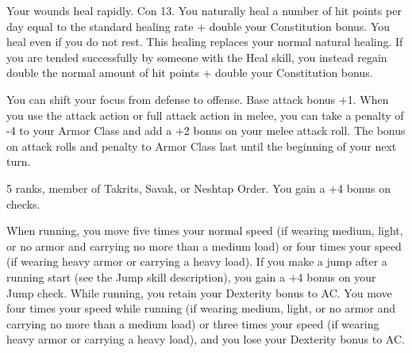 {Your wounds heal rapidly.}
{Con 13.}
{You naturally heal a number of hit points per day equal to the standard healing rate + double your Constitution bonus. You heal even if you do not rest. This healing replaces your normal natural healing. If you are tended successfully by someone with the Heal skill, you instead regain double the normal amount of hit points + double your Constitution bonus.}{}{}

{You can shift your focus from defense to offense.}
{Base attack bonus +1.}
{When you use the attack action or full attack action in melee, you can take a penalty of -4 to your Armor Class and add a +2 bonus on your melee attack roll. The bonus on attack rolls and penalty to Armor Class last until the beginning of your next turn.}{}{}

{ 5 ranks, member of Takrits, Savak, or Neshtap Order.}
{You gain a +4 bonus on  checks.}

{}{}
{When running, you move five times your normal speed (if wearing medium, light, or no armor and carrying no more than a medium load) or four times your speed (if wearing heavy armor or carrying a heavy load). If you make a jump after a running start (see the Jump skill description), you gain a +4 bonus on your Jump check. While running, you retain your Dexterity bonus to AC.}
{You move four times your speed while running (if wearing medium, light, or no armor and carrying no more than a medium load) or three times your speed (if wearing heavy armor or carrying a heavy load), and you lose your Dexterity bonus to AC.}{}

